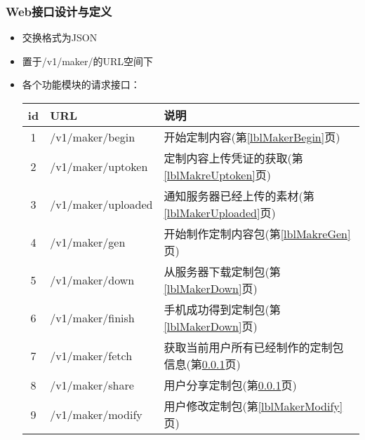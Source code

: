 \documentclass{beamer}
\begin{document}
\begin{frame}
\frametitle{Web接口设计与定义}

\begin{itemize}
 \item 交换格式为JSON
 \item 置于/v1/maker/的URL空间下
 \item 各个功能模块的请求接口：
 
 \vspace{0.2cm}
 \bgroup
\def\arraystretch{1.15} 
\scriptsize
\begin{tabular}{|c|l|l|}
\hline
{id} &{URL} & {说明}\\
\hline
{1} &{/v1/maker/begin} & {开始定制内容(第\ref{lblMakerBegin}页)}  \\
{2} &{/v1/maker/uptoken} & {定制内容上传凭证的获取(第\ref{lblMakreUptoken}页)}  \\
{3} & {/v1/maker/uploaded} & {通知服务器已经上传的素材(第\ref{lblMakerUploaded}页)} \\
{4} & {/v1/maker/gen} & {开始制作定制内容包(第\ref{lblMakreGen}页)}  \\
{5} & {/v1/maker/down} & {从服务器下载定制包(第\ref{lblMakerDown}页)} \\
{6} & {/v1/maker/finish} & {手机成功得到定制包(第\ref{lblMakerDown}页)} \\
{7} & {/v1/maker/fetch} & {获取当前用户所有已经制作的定制包信息(第\ref{}页)} \\
{8} & {/v1/maker/share} & {用户分享定制包(第\ref{}页)} \\
{9} & {/v1/maker/modify} & {用户修改定制包(第\ref{lblMakerModify}页)} \\
\hline
\end{tabular}
\egroup

\end{itemize}

\end{frame}
\end{document}
